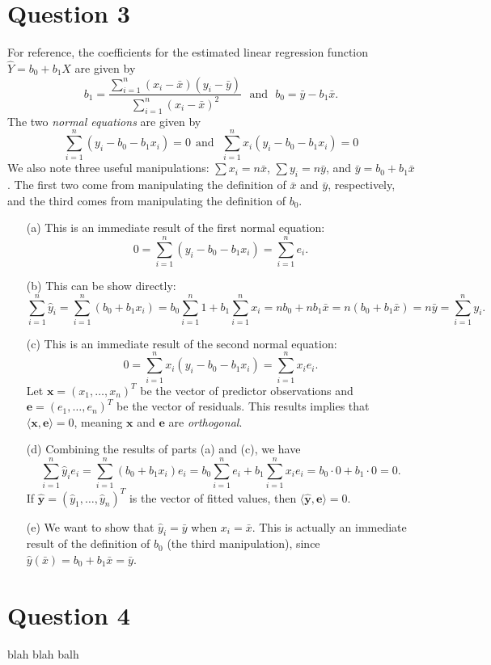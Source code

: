 \documentclass[10pt]{article}
\begin{document}
\section{Question 3} \noindent
For reference, the coefficients for the estimated linear regression function \(\hat{Y} = b_0 + b_1 X\) are
given by \[b_1 = \frac{\sum_{i=1}^n (x_i - \bar{x})(y_i - \bar{y})}{\sum_{i=1}^n(x_i - \bar{x})^2} ~~~\text{and}~~~ b_0 = \bar{y} - b_1 \bar{x}.\] 
The two \textit{normal equations} are given by 
\[
    \sum_{i=1}^{n} \left( y_i - b_0 - b_1 x_i \right) = 0 ~~\text{and}~~~ \sum_{i=1}^{n} x_i \left( y_i - b_0 - b_1 x_i \right) = 0
\]
We also note three useful manipulations:
\(\sum x_i = n \bar{x}\), \(\sum y_i = n \bar{y}\), and \(\bar{y} = b_0 + b_1 \bar{x}\).
The first two come from manipulating the definition of \(\bar{x}\) and \(\bar{y}\), respectively, and the third comes from manipulating the 
definition of \(b_0\).
\begin{itemize}
    \item[(a)] This is an immediate result of the first normal equation: 
    \[
        0 = \sum_{i=1}^{n} \left( y_i - b_0 - b_1 x_i \right) = \sum_{i=1}^n e_i.
    \]
    \item[(b)] This can be show directly:
    \[
        \sum_{i=1}^n \hat{y}_i = \sum_{i=1}^n \left( b_0 + b_1 x_i \right) = b_0 \sum_{i=1}^n 1 + b_1 \sum_{i=1}^n x_i
        = n b_0 + n b_1 \bar{x} = n(b_0 + b_1 \bar{x}) = n \bar{y} = \sum_{i=1}^n y_i.
    \]
    \item[(c)] This is an immediate result of the second normal equation:
    \[
        0 = \sum_{i=1}^{n} x_i \left( y_i - b_0 - b_1 x_i \right) = \sum_{i=1}^n x_i e_i.
    \]
    Let \(\mathbf{x} = (x_1,\ldots,x_n)^T\) be the vector of predictor observations and 
    \(\mathbf{e} = (e_1,\ldots,e_n)^T\) be the vector of residuals. This results implies that \(\langle\mathbf{x},\mathbf{e}\rangle = 0\), meaning
    \(\mathbf{x}\) and \(\mathbf{e}\) are \textit{orthogonal}.
    \item[(d)] Combining the results of parts (a) and (c), we have 
    \[
        \sum_{i=1}^n \hat{y}_i e_i = \sum_{i=1}^n \left( b_0 + b_1 x_i \right) e_i = b_0 \sum_{i=1}^n e_i + b_1 \sum_{i=1}^n x_i e_i
        = b_0 \cdot 0 + b_1 \cdot 0 = 0.
    \]
    If \(\hat{\mathbf{y}} = (\hat{y}_1,\ldots,\hat{y}_n)^T\) is the vector of fitted values, then \(\langle\hat{\mathbf{y}},\mathbf{e}\rangle=0\).
    \item[(e)] We want to show that \(\hat{y}_i = \bar{y}\) when \(x_i = \bar{x}\). This is actually an immediate result of the definition of \(b_0\)
    (the third manipulation), since 
    \(\hat{y}(\bar{x}) = b_0 + b_1 \bar{x} = \bar{y}\).
\end{itemize}

\section{Question 4} \noindent
blah blah balh
\end{document}
